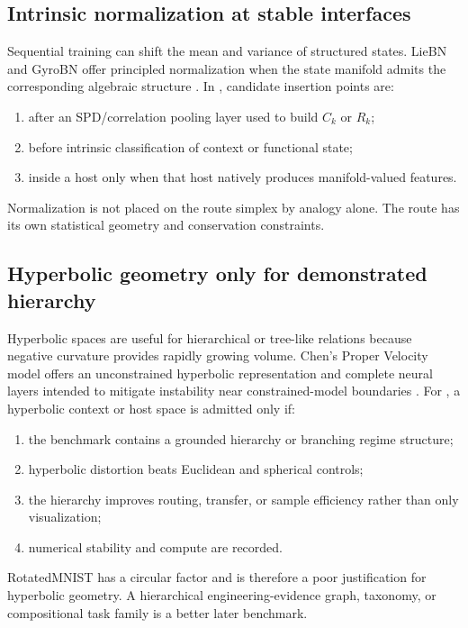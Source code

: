 \subsection{Intrinsic normalization at stable interfaces}
Sequential training can shift the mean and variance of structured states. LieBN and GyroBN offer principled normalization when the state manifold admits the corresponding algebraic structure \citep{chen2024liebn,chen2025gyrobn}. In \RGM{}, candidate insertion points are:
\begin{enumerate}[leftmargin=1.7em]
  \item after an SPD/correlation pooling layer used to build $C_k$ or $R_k$;
  \item before intrinsic classification of context or functional state;
  \item inside a host only when that host natively produces manifold-valued features.
\end{enumerate}
Normalization is not placed on the route simplex by analogy alone. The route has its own statistical geometry and conservation constraints.

\subsection{Hyperbolic geometry only for demonstrated hierarchy}
Hyperbolic spaces are useful for hierarchical or tree-like relations because negative curvature provides rapidly growing volume. Chen's Proper Velocity model offers an unconstrained hyperbolic representation and complete neural layers intended to mitigate instability near constrained-model boundaries \citep{chen2026pvnn}. For \MMALS{}, a hyperbolic context or host space is admitted only if:
\begin{enumerate}[leftmargin=1.7em]
  \item the benchmark contains a grounded hierarchy or branching regime structure;
  \item hyperbolic distortion beats Euclidean and spherical controls;
  \item the hierarchy improves routing, transfer, or sample efficiency rather than only visualization;
  \item numerical stability and compute are recorded.
\end{enumerate}
RotatedMNIST has a circular factor and is therefore a poor justification for hyperbolic geometry. A hierarchical engineering-evidence graph, taxonomy, or compositional task family is a better later benchmark.



